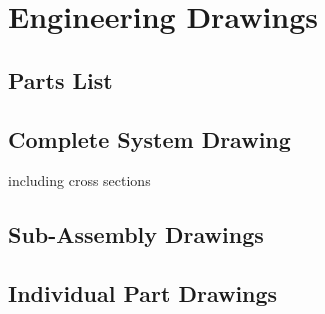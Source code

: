 \documentclass[../main.tex]{subfiles}
\begin{document}
	\chapter{Engineering Drawings}
	\section{Parts List}
	
	\section{Complete System Drawing}
	including cross sections
	
	\section{Sub-Assembly Drawings}
	
	\section{Individual Part Drawings}
\end{document}
